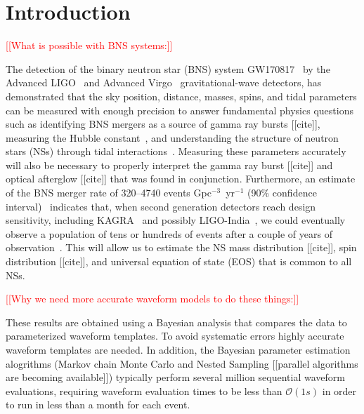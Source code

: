 \documentclass[prd,aps,letter,twocolumn,floatfix,notitlepage,nofootinbib]{revtex4-1}
\newcommand{\red}[1]{\textcolor{red}{#1}}
\begin{document}
\maketitle


\section{Introduction}

\red{[[What is possible with BNS systems:]]}

The detection of the binary neutron star (BNS) system GW170817~\cite{GW170817} by the Advanced LIGO~\cite{Harry2010} and Advanced Virgo~\cite{Acernese2009} gravitational-wave detectors, has demonstrated that the sky position, distance, masses, spins, and tidal parameters can be measured with enough precision to answer fundamental physics questions such as identifying BNS mergers as a source of gamma ray bursts [[cite]], measuring the Hubble constant~\cite{GW170817Hubble}, and understanding the structure of neutron stars (NSs) through tidal interactions~\cite{GW170817}. Measuring these parameters accurately will also be necessary to properly interpret the gamma ray burst [[cite]] and optical afterglow [[cite]] that was found in conjunction. Furthermore, an estimate of the BNS merger rate of 320--4740 events Gpc$^{-3}$~yr$^{-1}$ (90\% confidence interval)~\cite{GW170817} indicates that, when second generation detectors reach design sensitivity, including KAGRA~\cite{Somiya2012} and possibly LIGO-India~\cite{IyerSouradeepUnnikrishnan2011}, we could eventually observe a population of tens or hundreds of events after a couple of years of observation~\cite{LIGORate2010}. This will allow us to estimate the NS mass distribution [[cite]], spin distribution [[cite]], and universal equation of state (EOS) that is common to all NSs\cite{DelPozzoLiAgathos2013, LackeyWade2015}. 

\red{[[Why we need more accurate waveform models to do these things:]]}

These results are obtained using a Bayesian analysis that compares the data to parameterized waveform templates. To avoid systematic errors highly accurate waveform templates are needed. In addition, the Bayesian parameter estimation alogrithms (Markov chain Monte Carlo and Nested Sampling [[parallel algorithms are becoming available]]) typically perform several million sequential waveform evaluations, requiring waveform evaluation times to be less than $\mathcal{O}(1s)$ in order to run in less than a month for each event.
\end{document}
